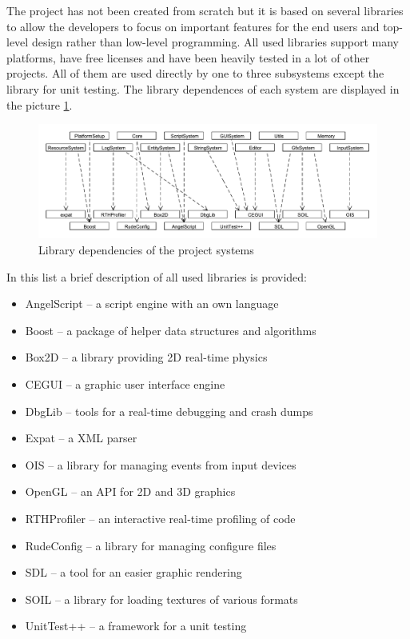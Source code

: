 \documentclass[a4paper, 12pt]{report}
\begin{document}
The project has not been created from scratch but it is based on several libraries to allow the developers to focus on important features for the end users and top-level design rather than low-level programming. All used libraries support many platforms, have free licenses and have been heavily tested in a lot of other projects. All of them are used directly by one to three subsystems except the library for unit testing. The library dependences of each system are displayed in the picture \ref{fig:library-dependence}.

\begin{figure}[htbp]
	\centering
		\includegraphics[width=1\textwidth]{LibraryDependence.pdf}
	\caption{Library dependencies of the project systems}
	\label{fig:library-dependence}
\end{figure}

In this list a brief description of all used libraries is provided:

\begin{itemize}
  \item AngelScript -- a script engine with an own language
  \item Boost -- a package of helper data structures and algorithms
  \item Box2D -- a library providing 2D real-time physics
  \item CEGUI -- a graphic user interface engine
  \item DbgLib -- tools for a real-time debugging and crash dumps
  \item Expat -- a XML parser
  \item OIS -- a library for managing events from input devices
  \item OpenGL -- an API for 2D and 3D graphics
  \item RTHProfiler -- an interactive real-time profiling of code
  \item RudeConfig -- a library for managing configure files
  \item SDL -- a tool for an easier graphic rendering
  \item SOIL -- a library for loading textures of various formats
  \item UnitTest++ -- a framework for a unit testing
\end{itemize}
\end{document}
